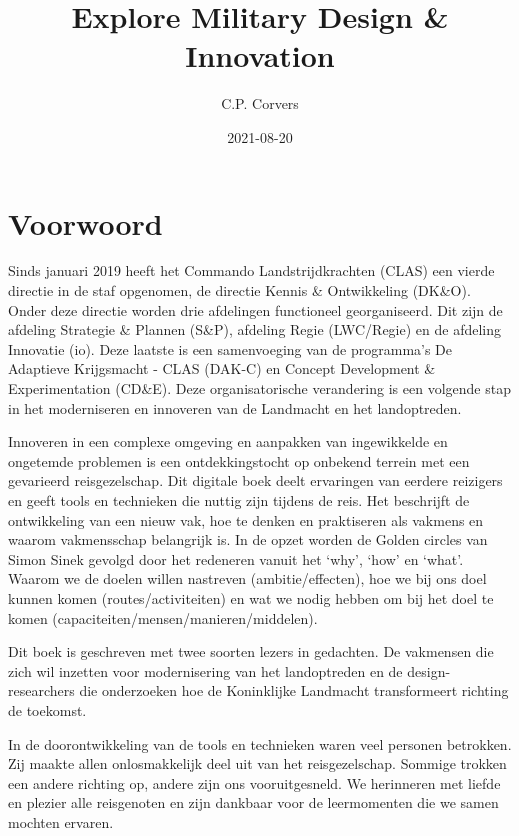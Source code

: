 \documentclass[
]{book}
\title{Explore Military Design \& Innovation}
\author{C.P. Corvers}
\date{2021-08-20}
\begin{document}
\maketitle

{
\setcounter{tocdepth}{1}
\tableofcontents
}
\hypertarget{voorwoord}{%
\chapter*{Voorwoord}\label{voorwoord}}

Sinds januari 2019 heeft het Commando Landstrijdkrachten (CLAS) een vierde directie in de staf opgenomen, de directie Kennis \& Ontwikkeling (DK\&O). Onder deze directie worden drie afdelingen functioneel georganiseerd. Dit zijn de afdeling Strategie \& Plannen (S\&P), afdeling Regie (LWC/Regie) en de afdeling Innovatie (io). Deze laatste is een samenvoeging van de programma's De Adaptieve Krijgsmacht - CLAS (DAK-C) en Concept Development \& Experimentation (CD\&E). Deze organisatorische verandering is een volgende stap in het moderniseren en innoveren van de Landmacht en het landoptreden.

Innoveren in een complexe omgeving en aanpakken van ingewikkelde en ongetemde problemen is een ontdekkingstocht op onbekend terrein met een gevarieerd reisgezelschap. Dit digitale boek deelt ervaringen van eerdere reizigers en geeft tools en technieken die nuttig zijn tijdens de reis. Het beschrijft de ontwikkeling van een nieuw vak, hoe te denken en praktiseren als vakmens en waarom vakmensschap belangrijk is. In de opzet worden de Golden circles van Simon Sinek gevolgd door het redeneren vanuit het `why', `how' en `what'. Waarom we de doelen willen nastreven (ambitie/effecten), hoe we bij ons doel kunnen komen (routes/activiteiten) en wat we nodig hebben om bij het doel te komen (capaciteiten/mensen/manieren/middelen).

Dit boek is geschreven met twee soorten lezers in gedachten. De vakmensen die zich wil inzetten voor modernisering van het landoptreden en de design-researchers die onderzoeken hoe de Koninklijke Landmacht transformeert richting de toekomst.

In de doorontwikkeling van de tools en technieken waren veel personen betrokken. Zij maakte allen onlosmakkelijk deel uit van het reisgezelschap. Sommige trokken een andere richting op, andere zijn ons vooruitgesneld. We herinneren met liefde en plezier alle reisgenoten en zijn dankbaar voor de leermomenten die we samen mochten ervaren.
\end{document}

